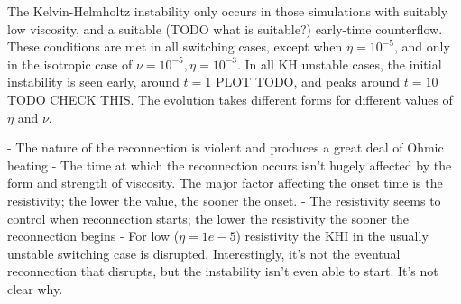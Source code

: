 The Kelvin-Helmholtz instability only occurs in those simulations with suitably low viscosity, and a suitable (TODO what is suitable?) early-time counterflow. These conditions are met in all switching cases, except when $\eta=10^{-5}$, and only in the isotropic case of $\nu = 10^{-5}, \eta=10^{-3}$. In all KH unstable cases, the initial instability is seen early, around $t=1$ PLOT TODO, and peaks around $t=10$ TODO CHECK THIS. The evolution takes different forms for different values of $\eta$ and $\nu$.

- The nature of the reconnection is violent and produces a great deal of Ohmic heating
- The time at which the reconnection occurs isn't hugely affected by the form and strength of viscosity. The major factor affecting the onset time is the resistivity; the lower the value, the sooner the onset.
- The resistivity seems to control when reconnection starts; the lower the resistivity the sooner the reconnection begins
- For low ($\eta=1e-5$) resistivity the KHI in the usually unstable switching case is disrupted. Interestingly, it's not the eventual reconnection that disrupts, but the instability isn't even able to start. It's not clear why.
